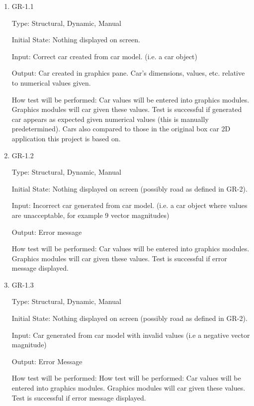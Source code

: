 \documentclass[12pt, titlepage]{article}
\begin{document}
\begin{enumerate}

\item{GR-1.1\\}

Type: Structural, Dynamic, Manual
					
Initial State: Nothing displayed on screen.
					
Input: Correct car created from car model. (i.e. a car object)
					
Output: Car created in graphics pane. Car's dimensions, values, etc. relative to 
numerical values given.
					
How test will be performed: Car values will be entered into graphics modules. 
Graphics modules will car given these values. Test is  successful if generated 
car appears as expected given numerical values (this is manually predetermined). 
Cars also compared to those in the original box car 2D application this project 
is based on.

\item{GR-1.2\\}

Type: Structural, Dynamic, Manual
					
Initial State: Nothing displayed on screen (possibly road as defined in GR-2).
					
Input: Incorrect car generated from car model. (i.e. a car object where values 
are unacceptable, for example 9 vector magnitudes)
					
Output: Error message
					
How test will be performed: Car values will be entered into graphics modules. 
Graphics modules will car given these values. Test is successful if error 
message displayed.

\item{GR-1.3\\}

Type: Structural, Dynamic, Manual
					
Initial State: Nothing displayed on screen (possibly road as defined in GR-2).
					
Input: Car generated from car model with invalid values (i.e a negative vector 
magnitude)
					
Output: Error Message
					
How test will be performed: How test will be performed: Car values will be 
entered into graphics modules. Graphics modules will car given these values. 
Test is successful if error message displayed.
					

\end{enumerate}
\end{document}
